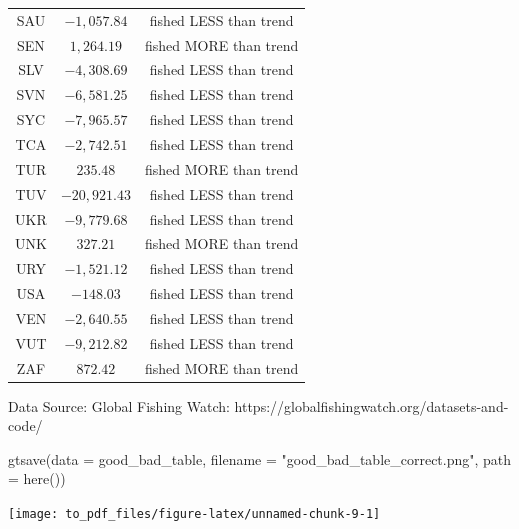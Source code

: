 \documentclass[
]{article}
\newenvironment{Shaded}{\begin{snugshade}}{\end{snugshade}}
\newcommand{\AttributeTok}[1]{\textcolor[rgb]{0.77,0.63,0.00}{#1}}
\newcommand{\FunctionTok}[1]{\textcolor[rgb]{0.00,0.00,0.00}{#1}}
\newcommand{\NormalTok}[1]{#1}
\newcommand{\StringTok}[1]{\textcolor[rgb]{0.31,0.60,0.02}{#1}}
\begin{document}
\begin{longtable}{ccc}
SAU & $-1,057.84$ & fished LESS than trend \\ 
SEN & $1,264.19$ & fished MORE than trend \\ 
SLV & $-4,308.69$ & fished LESS than trend \\ 
SVN & $-6,581.25$ & fished LESS than trend \\ 
SYC & $-7,965.57$ & fished LESS than trend \\ 
TCA & $-2,742.51$ & fished LESS than trend \\ 
TUR & $235.48$ & fished MORE than trend \\ 
TUV & $-20,921.43$ & fished LESS than trend \\ 
UKR & $-9,779.68$ & fished LESS than trend \\ 
UNK & $327.21$ & fished MORE than trend \\ 
URY & $-1,521.12$ & fished LESS than trend \\ 
USA & $-148.03$ & fished LESS than trend \\ 
VEN & $-2,640.55$ & fished LESS than trend \\ 
VUT & $-9,212.82$ & fished LESS than trend \\ 
ZAF & $872.42$ & fished MORE than trend \\ 
 \bottomrule
\end{longtable}
\begin{minipage}{\linewidth}
Data Source: Global Fishing Watch: https://globalfishingwatch.org/datasets-and-code/\\ 
\end{minipage}

\begin{Shaded}
\begin{Highlighting}[]
\FunctionTok{gtsave}\NormalTok{(}\AttributeTok{data =}\NormalTok{ good\_bad\_table, }\AttributeTok{filename =} \StringTok{"good\_bad\_table\_correct.png"}\NormalTok{, }\AttributeTok{path =} \FunctionTok{here}\NormalTok{())}
\end{Highlighting}
\end{Shaded}

\texttt{[image: to\_pdf\_files/figure-latex/unnamed-chunk-9-1]}
\end{document}
